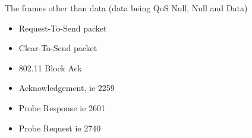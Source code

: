 The frames other than data (data being QoS Null, Null and Data)
\begin{itemize}
\item Request-To-Send packet
\item Clear-To-Send packet
\item 802.11 Block Ack
\item Acknowledgement, ie 2259
\item Probe Response ie 2601
\item Probe Request ie 2740
\end{itemize}


%
%
%
